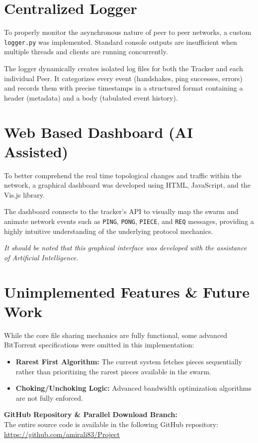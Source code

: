 \documentclass[a4paper,12pt]{article}
\begin{document}
\section{Centralized Logger}
To properly monitor the asynchronous nature of peer to peer networks, a custom \texttt{logger.py} was implemented. 
Standard console outputs are insufficient when multiple threads and clients are running concurrently. 

The logger dynamically creates isolated log files for both the Tracker and each individual Peer. 
It categorizes every event (handshakes, ping successes, errors) and records them with precise timestamps in a structured format containing a header (metadata) and a body (tabulated event history).

\section{Web Based Dashboard (AI Assisted)}
To better comprehend the real time topological changes and traffic within the network, a graphical dashboard was developed using HTML, JavaScript, and the Vis.js library. 

The dashboard connects to the tracker's API to visually map the swarm and animate network events such as \texttt{PING}, \texttt{PONG}, \texttt{PIECE}, and \texttt{REQ} messages, providing a highly intuitive understanding of the underlying protocol mechanics.

\textit{It should be noted that this graphical interface was developed with the assistance of Artificial Intelligence.} 

\section{Unimplemented Features \& Future Work}
While the core file sharing mechanics are fully functional, some advanced BitTorrent specifications were omitted in this implementation:
\begin{itemize}
    \item \textbf{Rarest First Algorithm:} The current system fetches pieces sequentially rather than prioritizing the rarest pieces available in the swarm.
    \item \textbf{Choking/Unchoking Logic:} Advanced bandwidth optimization algorithms are not fully enforced.
\end{itemize}

\textbf{GitHub Repository \& Parallel Download Branch:}\\
The entire source code is available in the following GitHub repository:\\
\url{https://github.com/amirali83/Project} 
\end{document}
